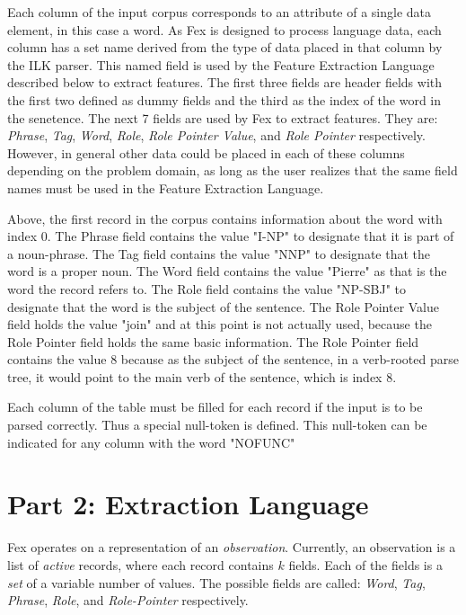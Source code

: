 \documentclass[11pt]{article}
\begin{document}
\vfill
Each column of the input corpus corresponds to an attribute of a single data
element, in this case a word.  As Fex is designed to process language data, each
column has a set name derived from the type of data placed in that column by the
ILK parser.  This named field is used by the Feature Extraction Language
described below to extract features.  The first three fields are header fields 
with the first two defined as dummy fields and the third as the index of the
word in the senetence.  The next 7 fields are used by Fex to extract features.
They are:  {\em Phrase}, {\em Tag}, {\em Word}, {\em Role}, {\em Role Pointer
Value}, and {\em Role Pointer} respectively.  However, in general other data 
could be placed in each of these columns depending on the problem domain, as 
long as the user realizes that the same field names must be used in the Feature 
Extraction Language.  

Above, the first record in the corpus contains information about the word with
index 0.  The Phrase field contains the value "I-NP" to designate that it is
part of a noun-phrase.  The Tag field contains the value "NNP" to designate that
the word is a proper noun.  The Word field contains the value "Pierre" as that
is the word the record refers to.  The Role field contains the value "NP-SBJ" to
designate that the word is the subject of the sentence.  The Role Pointer Value
field holds the value "join" and at this point is not actually used, because
the Role Pointer field holds the same basic information.  The Role Pointer field
contains the value 8 because as the subject of the sentence, in a verb-rooted
parse tree, it would point to the main verb of the sentence, which is index 8. 

Each column of the table must be filled for each record if the input is to be
parsed correctly.  Thus a special null-token is defined.  This
null-token can be indicated for any column with the word "NOFUNC"

\section*{Part 2: Extraction Language}

Fex operates on a representation of an {\em observation}.  Currently,
an observation is a list of {\em active} records, where each record
contains $k$ fields.  Each of the fields
is a {\em set} of a variable number of values. The possible fields are called:
{\em Word}, {\em Tag}, {\em Phrase}, {\em Role}, and {\em Role-Pointer} respectively.
\end{document}
